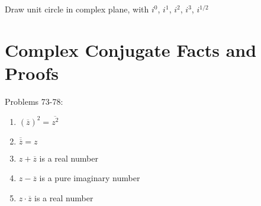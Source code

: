 \documentclass{exam}
\begin{document}
  Draw unit circle in complex plane, with $i^0$, $i^1$, $i^2$, $i^3$, $i^{1/2}$

  \section{Complex Conjugate Facts and Proofs}

  Problems 73-78:
  \begin{enumerate}
    \item $\left( \overline{z} \right)^2 = \overline{z^2}$

    \item $\overline{\overline{z}} = z$

    \item $z + \overline{z}$ is a real number

    \item $z - \overline{z}$ is a pure imaginary number

    \item $z \cdot \overline{z}$ is a real number
  \end{enumerate}
\end{document}
